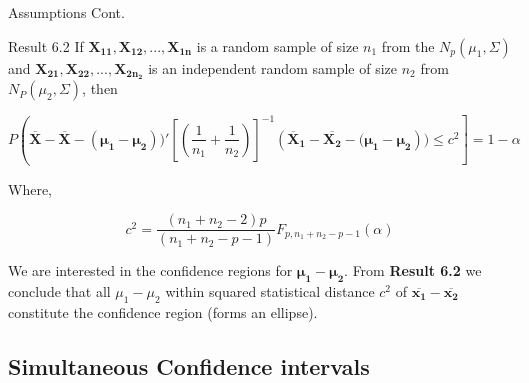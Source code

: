\documentclass[8pt]{beamer}
\begin{document}
    \begin{frame}{Assumptions Cont.}
        \label{res:2}
        \begin{block}{Result 6.2}
            If $\mathbf{X_{11},X_{12},...,X_{1n}}$ is a random sample of size $n_{1}$ from the $N_{p}(\mu_{1},\Sigma)$ and $\mathbf{X_{21},X_{22},...,X_{2n_{2}}}$ is an independent random sample of size $n_{2}$ from $N_{P}(\mu_{2},\Sigma)$, then 
            
            \begin{equation}
                P\left(\mathbf{\overline{X}} - \mathbf{\overline{X}} - (\mathbf{\mu_{1} - \mu_{2}}))'\left[\left(\frac{1}{n_{1}} + \frac{1}{n_{2}}\right)\right]^{-1}(\mathbf{\overline{X}_{1} - \overline{X_{2}} - (\mu_{1} - \mu_{2}})) \leq c^{2} \right] = 1 - \alpha
            \end{equation}
            
            Where, 
            
            \begin{equation*}
                c^{2} = \frac{(n_{1} + n_{2} - 2)p}{(n_{1} + n_{2} - p - 1)}F_{p,n_{1}+n_{2}-p-1}(\alpha)
            \end{equation*}
        \end{block}
        
        We are interested in the confidence regions for $\mathbf{\mu_{1} - \mu_{2}}$. From \textbf{Result 6.2} we conclude that all $\mu_{1} - \mu_{2}$ within squared statistical distance $c^{2}$ of $\mathbf{\overline{x_{1}} - \overline{x_{2}}}$ constitute the confidence region (forms an ellipse). 
    \end{frame}
    
    \subsection{Simultaneous Confidence intervals}
    
\end{document}
